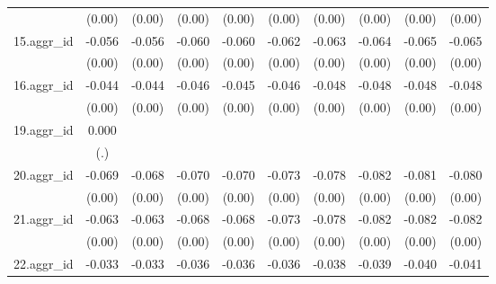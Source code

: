 {\begin{tabular}{l*{9}{c}}
          &   (0.00)         &   (0.00)         &   (0.00)         &   (0.00)         &   (0.00)         &   (0.00)         &   (0.00)         &   (0.00)         &   (0.00)         \\
[1em]
15.aggr\_id&   -0.056\sym{***}&   -0.056\sym{***}&   -0.060\sym{***}&   -0.060\sym{***}&   -0.062\sym{***}&   -0.063\sym{***}&   -0.064\sym{***}&   -0.065\sym{***}&   -0.065\sym{***}\\
          &   (0.00)         &   (0.00)         &   (0.00)         &   (0.00)         &   (0.00)         &   (0.00)         &   (0.00)         &   (0.00)         &   (0.00)         \\
[1em]
16.aggr\_id&   -0.044\sym{***}&   -0.044\sym{***}&   -0.046\sym{***}&   -0.045\sym{***}&   -0.046\sym{***}&   -0.048\sym{***}&   -0.048\sym{***}&   -0.048\sym{***}&   -0.048\sym{***}\\
          &   (0.00)         &   (0.00)         &   (0.00)         &   (0.00)         &   (0.00)         &   (0.00)         &   (0.00)         &   (0.00)         &   (0.00)         \\
[1em]
19.aggr\_id&    0.000         &                  &                  &                  &                  &                  &                  &                  &                  \\
          &      (.)         &                  &                  &                  &                  &                  &                  &                  &                  \\
[1em]
20.aggr\_id&   -0.069\sym{***}&   -0.068\sym{***}&   -0.070\sym{***}&   -0.070\sym{***}&   -0.073\sym{***}&   -0.078\sym{***}&   -0.082\sym{***}&   -0.081\sym{***}&   -0.080\sym{***}\\
          &   (0.00)         &   (0.00)         &   (0.00)         &   (0.00)         &   (0.00)         &   (0.00)         &   (0.00)         &   (0.00)         &   (0.00)         \\
[1em]
21.aggr\_id&   -0.063\sym{***}&   -0.063\sym{***}&   -0.068\sym{***}&   -0.068\sym{***}&   -0.073\sym{***}&   -0.078\sym{***}&   -0.082\sym{***}&   -0.082\sym{***}&   -0.082\sym{***}\\
          &   (0.00)         &   (0.00)         &   (0.00)         &   (0.00)         &   (0.00)         &   (0.00)         &   (0.00)         &   (0.00)         &   (0.00)         \\
[1em]
22.aggr\_id&   -0.033\sym{***}&   -0.033\sym{***}&   -0.036\sym{***}&   -0.036\sym{***}&   -0.036\sym{***}&   -0.038\sym{***}&   -0.039\sym{***}&   -0.040\sym{***}&   -0.041\sym{***}\\

\end{tabular}}
